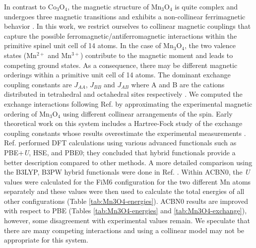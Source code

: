 \documentclass[12pt,a4paper,final]{iopart}
\begin{document}
 In contrast to Co$_3$O$_4$, the magnetic structure of Mn$_3$O$_4$ is quite complex and undergoes three magnetic transitions and exhibits a non-collinear ferrimagnetic behavior \cite{hirai2015electronic,franchini2007ground}. In this work, we restrict ourselves to collinear magnetic couplings that capture the possible ferromagnetic/antiferromagnetic  interactions within the primitive spinel unit cell of 14 atoms. In the case of Mn$_3$O$_4$,  the two valence states (Mn$^{2+}$ and Mn$^{3+}$) contribute to the magnetic moment and leads to competing ground states. As a consequence, there may be different magnetic orderings  within a primitive unit cell of 14 atoms. The dominant exchange coupling constants are $J_{AA}$, $J_{BB}$ and $J_{AB}$ where A and B are the cations distributed in tetrahedral and octahedral sites respectively \cite{chartier1999ab,ribeiro2015density}.
We computed  the exchange interactions following Ref. \cite{chartier1999ab}  by approximating the experimental magnetic ordering of Mn$_3$O$_4$ using different collinear arrangements of the spin.
 Early theoretical work on this system includes a Hartree-Fock study of the exchange coupling constants whose results overestimate the experimental measurements \cite{chartier1999ab}. Ref. \cite{franchini2007ground} performed DFT calculations using various advanced functionals such as PBE+\textit{U}, HSE, and PBE0; they concluded that  hybrid functionals provide a better description compared to other methods. A more detailed comparison using the B3LYP, B3PW hybrid functionals were done in Ref. \cite{ribeiro2015density}. Within ACBN0, the \textit{U} values were calculated for the FiM6 configuration for the two different Mn atoms separately and these values were then used to calculate the total energies of all other configurations (Table \ref{tab:Mn3O4-energies}). 
ACBN0 results are improved with respect to PBE (Tables \ref{tab:Mn3O4-energies} and \ref{tab:Mn3O4-exchange}), however, some disagreement with experimental values remain. We speculate that there are many competing interactions and using a collinear model may not be appropriate for this system. 
\end{document}
